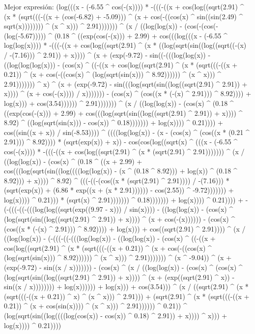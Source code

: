 Mejor expresión: (log(((x - (-6.55 ^ cos(-(x)))) * -(((-((x + cos(log((sqrt(2.91) ^ (x * (sqrt(((-((x + (cos(-6.82) + -5.09))) ^ (x + cos(-((cos(x) ^ sin((sin(2.49) ^ sqrt(x)))))))) ^ (x ^ x))) ^ 2.91))))))) ^ (x / ((log(log(x)) - (cos(-(cos(-(log(-5.67))))) ^ (0.18 ^ ((exp(cos(-(x))) + 2.99) + cos(((log(((x - (-6.55 ^ log(log(x)))) * -(((-((x + cos(log((sqrt(2.91) ^ (x * ((log(sqrt(sin((log((sqrt((-(x) / -(7.16))) ^ 2.91)) + x)))) ^ (x + (exp(-9.72) - sin((-(((log(log(x)) - ((log(log(log(x))) - (cos(x) ^ ((-((x + cos(log((sqrt(2.91) ^ (x * (sqrt(((-((x + 0.21)) ^ (x + cos(-((cos(x) ^ (log(sqrt(sin(x))) ^ 8.92)))))) ^ (x ^ x))) ^ 2.91))))))) ^ x) ^ (x + (exp(-9.72) - sin(((log(sqrt(sin((log((sqrt(2.91) ^ 2.91)) + x)))) ^ (x + cos(-(x)))) / x))))))) - (cos(x) ^ (cos((x * (-(x) ^ 2.91))) ^ 8.92)))) + log(x))) + cos(3.54)))))) ^ 2.91))))))) ^ (x / ((log(log(x)) - (cos(x) ^ (0.18 ^ ((exp(cos(-(x))) + 2.99) + cos(((log(sqrt(sin((log((sqrt(2.91) ^ 2.91)) + x)))) ^ 8.92) ^ ((log(sqrt(sin(x))) - cos(x)) ^ 0.18))))))) + log(x)))) ^ 0.21)))) + cos((sin((x + x)) / sin(-8.53)))) ^ ((((log(log(x)) - (x - (cos(x) ^ (cos((x * (0.21 ^ 2.91))) ^ 8.92)))) * (sqrt(exp(x)) + x)) - cos(cos(log((sqrt(x) ^ (((x - (-6.55 ^ cos(-(x)))) * -(((-((x + cos(log((sqrt(2.91) ^ (x * (sqrt(2.91) ^ 2.91))))))) ^ (x / ((log(log(x)) - (cos(x) ^ (0.18 ^ ((x + 2.99) + cos(((log(sqrt(sin((log((((log(log(x)) - (x ^ (0.18 ^ 8.92))) + log(x)) ^ (0.18 ^ 8.92))) + x)))) ^ 8.92) ^ (((-((-(cos((x * (sqrt(2.91) ^ 2.91)))) / -(7.16))) * (sqrt(exp(x)) + (6.86 * exp((x + (x * 2.91)))))) - cos(2.55)) ^ -9.72))))))) + log(x)))) ^ 0.21))) * (sqrt(x) ^ 2.91))))))) ^ 0.18))))))) + log(x)))) ^ 0.21)))) + -(-(((-((-(((log(log((sqrt(exp((9.97 - x))) / sin(x)))) - ((log(log(x)) - (cos(x) ^ (log(sqrt(sin((log((sqrt(2.91) ^ 2.91)) + x)))) ^ (x + cos(-(x)))))) - (cos(x) ^ (cos((x * (-(x) ^ 2.91))) ^ 8.92)))) + log(x))) + cos((sqrt(2.91) ^ 2.91)))) ^ (x / ((log(log(x)) - (-(((-((-(((log(log(x)) - ((log(log(x)) - (cos(x) ^ ((-((x + cos(log((sqrt(2.91) ^ (x * (sqrt(((-((x + 0.21)) ^ (x + cos(-((cos(x) ^ (log(sqrt(sin(x))) ^ 8.92)))))) ^ (x ^ x))) ^ 2.91))))))) ^ (x ^ -9.04)) ^ (x + (exp(-9.72) - sin((x / x))))))) - (cos(x) ^ (x / ((log(log(x)) - (cos(x) ^ (cos(x) ^ (log(sqrt(sin((log((sqrt(2.91) ^ 2.91)) + x)))) ^ (x + (exp((sqrt(2.91) ^ x)) - sin((x / x)))))))) + log(x)))))) + log(x))) + cos(3.54))) ^ (x / ((sqrt(2.91) ^ (x * (sqrt(((-((x + 0.21)) ^ x) ^ (x ^ x))) ^ 2.91))) + (sqrt(2.91) ^ (x * (sqrt(((-((x + 0.21)) ^ (x + cos(sin(x)))) ^ (x ^ x))) ^ 2.91)))))) ^ 0.21)) ^ (log(sqrt(sin((log((((log(cos(x)) - cos(x)) ^ 0.18) ^ 2.91)) + x)))) ^ x))) + log(x)))) ^ 0.21))))
